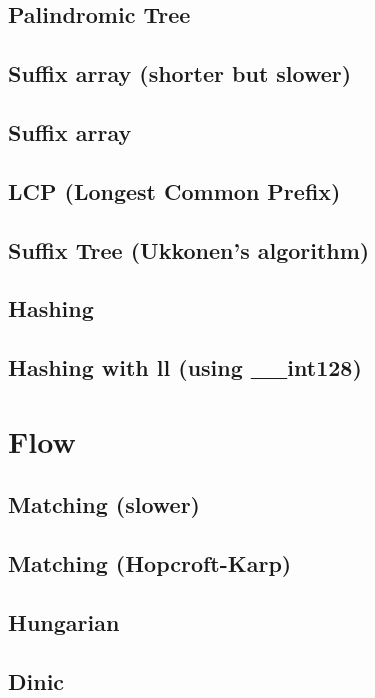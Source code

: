 \subsection{Palindromic Tree}
\subsection{Suffix array (shorter but slower)}
\subsection{Suffix array}
\subsection{LCP (Longest Common Prefix)}
\subsection{Suffix Tree (Ukkonen's algorithm)}
\subsection{Hashing}
\subsection{Hashing with ll (using \_\_int128)}

\section{Flow}
\subsection{Matching (slower)}
\subsection{Matching (Hopcroft-Karp)}
\subsection{Hungarian}
\subsection{Dinic}
